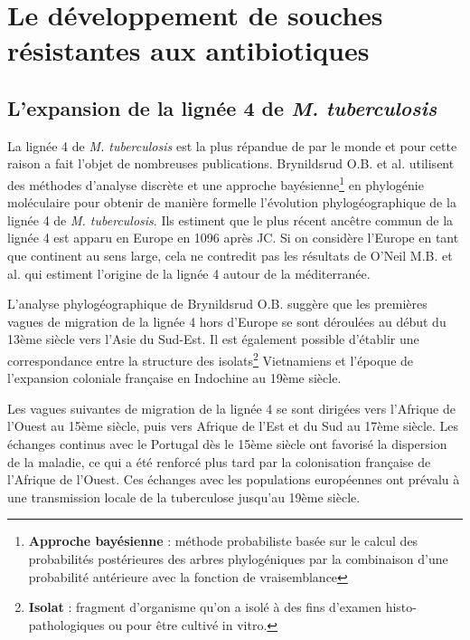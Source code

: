 \documentclass[twoside,a4paper,11pt,frenchb,openany]{report}
\begin{document}

\section{Le développement de souches résistantes aux antibiotiques}

\subsection{L'expansion de la lignée 4 de \textit{M. tuberculosis}}


La lignée 4 de \textit{M. tuberculosis} est la plus répandue de par le monde et pour cette raison a fait l'objet de nombreuses publications. Brynildsrud O.B. et al.\cite{brynildsrud} utilisent des méthodes d'analyse discrète et une approche bayésienne\footnote{\textbf{Approche bayésienne} : méthode probabiliste basée sur le calcul des probabilités postérieures des arbres phylogéniques par la combinaison d'une probabilité antérieure avec la fonction de vraisemblance} en phylogénie moléculaire pour obtenir de manière formelle l'évolution phylogéographique de la lignée 4 de \textit{M. tuberculosis}. Ils estiment que le plus récent ancêtre commun de la lignée 4 est apparu en Europe en 1096 après JC. Si on considère l'Europe en tant que continent au sens large, cela ne contredit pas les résultats de O'Neil M.B. et al.\cite{oneil} qui estiment l'origine de la lignée 4 autour de la méditerranée.


L'analyse phylogéographique de Brynildsrud O.B. suggère que les premières vagues de migration de la lignée 4 hors d'Europe se sont déroulées au début du 13ème siècle vers l'Asie du Sud-Est. Il est également possible d'établir une correspondance entre la structure des isolats\footnote{\textbf{Isolat} : fragment d'organisme qu'on a isolé à des fins d'examen histo-pathologiques ou pour être cultivé in vitro.} Vietnamiens et l'époque de l'expansion coloniale française en Indochine au 19ème siècle.

Les vagues suivantes de migration de la lignée 4 se sont dirigées vers l'Afrique de l'Ouest au 15ème siècle, puis vers Afrique de l'Est et du Sud au 17ème siècle. Les échanges continus avec le Portugal dès le 15ème siècle ont favorisé la dispersion de la maladie, ce qui a été renforcé plus tard par la colonisation française de l'Afrique de l'Ouest.  Ces échanges avec les populations européennes ont prévalu à une transmission locale de la tuberculose jusqu'au 19ème siècle. 
\end{document}
